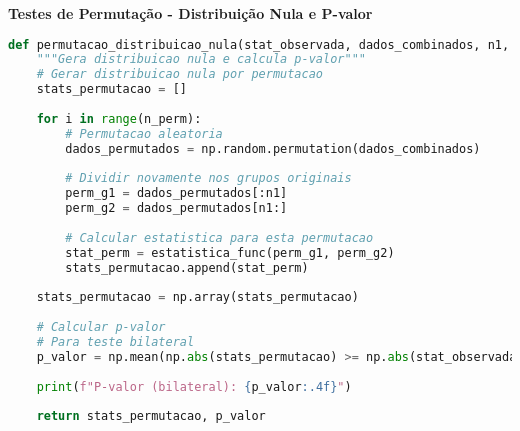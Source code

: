 \begin{examplebox}
\textbf{Testes de Permutação - Distribuição Nula e P-valor}

\begin{lstlisting}[language=Python]
def permutacao_distribuicao_nula(stat_observada, dados_combinados, n1, n2, estatistica_func, n_perm=10000):
    """Gera distribuicao nula e calcula p-valor"""
    # Gerar distribuicao nula por permutacao
    stats_permutacao = []
    
    for i in range(n_perm):
        # Permutacao aleatoria
        dados_permutados = np.random.permutation(dados_combinados)
        
        # Dividir novamente nos grupos originais
        perm_g1 = dados_permutados[:n1]
        perm_g2 = dados_permutados[n1:]
        
        # Calcular estatistica para esta permutacao
        stat_perm = estatistica_func(perm_g1, perm_g2)
        stats_permutacao.append(stat_perm)
    
    stats_permutacao = np.array(stats_permutacao)
    
    # Calcular p-valor
    # Para teste bilateral
    p_valor = np.mean(np.abs(stats_permutacao) >= np.abs(stat_observada))
    
    print(f"P-valor (bilateral): {p_valor:.4f}")
    
    return stats_permutacao, p_valor
\end{lstlisting}
\end{examplebox}

